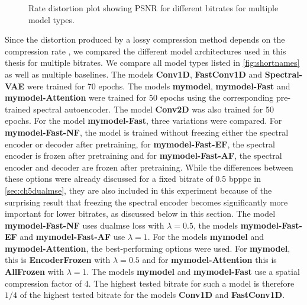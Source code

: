 \begin{figure}[!ht]
\caption[Rate Distortion Plot]{Rate distortion plot showing PSNR for different bitrates for multiple model types.}
\label{fig:ratedistortion}
\end{figure}

Since the distortion produced by a lossy compression method depends on the compression rate \citep{berger_rate-distortion_2003}, we compared the different model architectures used in this thesis for multiple bitrates. We compare all model types listed in \autoref{fig:shortnames} as well as multiple baselines. The models \textbf{Conv1D}, \textbf{FastConv1D} and \textbf{Spectral-VAE} were trained for 70 epochs. The models \textbf{\ac{mymodel}}, \textbf{\ac{mymodel}-Fast} and \textbf{\ac{mymodel}-Attention} were trained for 50 epochs using the corresponding pre-trained spectral autoencoder. The model \textbf{Conv2D} was also trained for 50 epochs. For the model \textbf{\ac{mymodel}-Fast}, three variations were compared. For \textbf{\ac{mymodel}-Fast-NF}, the model is trained without freezing either the spectral encoder or decoder after pretraining, for \textbf{\ac{mymodel}-Fast-EF}, the spectral encoder is frozen after pretraining and for \textbf{\ac{mymodel}-Fast-AF}, the spectral encoder and decoder are frozen after pretraining. While the differences between these options were already discussed for a fixed bitrate of 0.5 bpppc in \autoref{sec:ch5dualmse}, they are also included in this experiment because of the surprising result that freezing the spectral encoder becomes significantly more important for lower bitrates, as discussed below in this section. The model \textbf{\ac{mymodel}-Fast-NF} uses \ac{dualmse} loss with $\lambda=0.5$, the models \textbf{\ac{mymodel}-Fast-EF} and \textbf{\ac{mymodel}-Fast-AF} use $\lambda=1$. For the models \textbf{\ac{mymodel}} and \textbf{\ac{mymodel}-Attention}, the best-performing options were used. For \textbf{\ac{mymodel}}, this is \textbf{EncoderFrozen} with $\lambda=0.5$ and for \textbf{\ac{mymodel}-Attention} this is \textbf{AllFrozen} with $\lambda=1$. The models \textbf{\ac{mymodel}} and \textbf{\ac{mymodel}-Fast} use a spatial compression factor of 4. The highest tested bitrate for such a model is therefore $1/4$ of the highest tested bitrate for the models \textbf{Conv1D} and \textbf{FastConv1D}.

